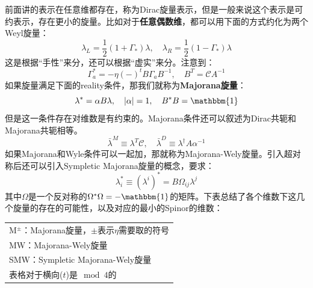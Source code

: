 前面讲的表示在任意维都存在，称为Dirac旋量表示，但是一般来说这个表示是可约表示，存在更小的旋量。比如对于\textbf{任意偶数维}，都可以用下面的方式约化为两个Weyl旋量：
\begin{equation}
	\lambda_L=\frac12\left(1+\Gamma_*\right)\lambda,\quad\lambda_R=\frac12\left(1-\Gamma_*\right)\lambda 
\end{equation}
这是根据“手性”来分，还可以根据“虚实”来分。注意到：
\begin{equation}
	\Gamma_{a}^{*}=-\eta(-)^{t}B\Gamma_{a}B^{-1},\quad B^{T}=\mathcal{C}A^{-1}
\end{equation}
如果旋量满足下面的reality条件，那我们就称为\textbf{Majorana旋量}：
\begin{equation}
	\lambda^*=\alpha B\lambda, \quad |\alpha|=1,\quad B^*B=\mathbbm{1}
\end{equation}
但是这一条件存在对维数是有约束的。Majorana条件还可以叙述为Dirac共轭和Majorana共轭相等。
\begin{equation}
	\bar{\lambda}^M\equiv\lambda^T\mathcal{C},\quad\bar{\lambda}^D\equiv\lambda^\dagger A\alpha^{-1}
\end{equation}	
如果Majorana和Wyle条件可以一起加，那就称为Majorana-Wely旋量。引入超对称后还可以引入Sympletic Majorana旋量的概念，要求：
\begin{equation}
	\lambda_i^*\equiv\left(\lambda^i\right)^*=B\Omega_{ij}\lambda^j
\end{equation}
其中$\Omega$是一个反对称的$\Omega^*\Omega=-\mathbbm{1}$的矩阵。下表总结了各个维数下这几个旋量的存在的可能性，以及对应的最小的Spinor的维数：\begin{margintable}\footnotesize 
	\begin{tabularx}{\marginparwidth}{|X}
		M$^\pm$：Majorana旋量，$\pm$表示$\eta$需要取的符号\\
		MW：Majorana-Wely旋量\\
		SMW：Sympletic Majorana-Wely旋量\\
		表格对于横向($t$)是$\mod 4$的	\end{tabularx}
\end{margintable}
